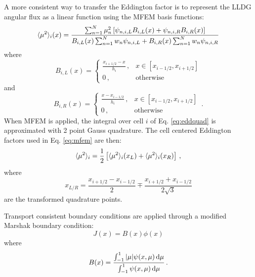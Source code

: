 A more consistent way to transfer the Eddington factor is to represent the LLDG angular flux as a linear function using the MFEM basis functions: 
	\begin{equation} \label{eq:eddquad}
		\langle \mu^2 \rangle_i(x) = \frac{
			\sum_{n=1}^N \mu_n^2 \left[\psi_{n,i,L}B_{i,L}(x) + \psi_{n,i,R} B_{i,R}(x)\right]
		}
		{
			B_{i,L}(x) \sum_{n=1}^N w_n \psi_{n,i,L} + B_{i,R}(x) \sum_{n=1}^N w_n \psi_{n,i,R} 
		}
	\end{equation}
where 
	\begin{equation}
		B_{i,L}(x) = \begin{cases}
			\frac{x_{i+1/2} - x}{h_i} \,, & x \in [x_{i-1/2}, x_{i+1/2}] \\ 
			0 \,, & \text{otherwise}
		\end{cases}
	\end{equation}
and 
	\begin{equation}
		B_{i,R}(x) = \begin{cases}
			\frac{x - x_{i-1/2}}{h_i} \,, & x \in [x_{i-1/2}, x_{i+1/2}] \\ 
			0 \,, & \text{otherwise}
		\end{cases} \,.
	\end{equation}
When MFEM is applied, the integral over cell $i$ of Eq. \ref{eq:eddquad} is approximated with 2 point Gauss quadrature. The cell centered Eddington factors used in Eq. \ref{eq:mfem} are then: 
	\begin{equation} 
		\langle \mu^2 \rangle_i = \frac{1}{2} \left[ \langle \mu^2 \rangle_i(x_L) + \langle \mu^2 \rangle_i(x_R) \right] \,,
	\end{equation}
where 
	\begin{equation}
		x_{L/R} = \frac{x_{i+1/2} - x_{i-1/2}}{2} \mp \frac{x_{i+1/2} + x_{i-1/2}}{2\sqrt{3}}
	\end{equation}
are the transformed quadrature points. 

Transport consistent boundary conditions are applied through a modified Marshak boundary condition: 
	\begin{equation} 
		J(x) = B(x) \phi(x) 
	\end{equation} 
where 
	\begin{equation} 
		B(x) = \frac{\int_{-1}^1 |\mu| \psi(x, \mu) \mathop{}\!\mathrm{d} \mu}
		{\int_{-1}^1 \psi(x, \mu) \mathop{}\!\mathrm{d} \mu} \,. 
	\end{equation}

